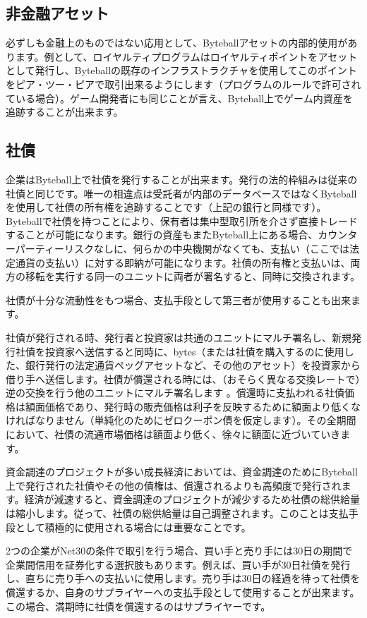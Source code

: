 \documentclass[a4paper, dvipdfmx]{jsarticle}
\begin{document}
\subsection{非金融アセット}
必ずしも金融上のものではない応用として、Byteballアセットの内部的使用があります。例として、ロイヤルティプログラムはロイヤルティポイントをアセットとして発行し、Byteballの既存のインフラストラクチャを使用してこのポイントをピア・ツー・ピアで取引出来るようにします（プログラムのルールで許可されている場合）。ゲーム開発者にも同じことが言え、Byteball上でゲーム内資産を追跡することが出来ます。

\subsection{社債}
企業はByteball上で社債を発行することが出来ます。発行の法的枠組みは従来の社債と同じです。唯一の相違点は受託者が内部のデータベースではなくByteballを使用して社債の所有権を追跡することです（上記の銀行と同様です）。Byteballで社債を持つことにより、保有者は集中型取引所を介さず直接トレードすることが可能になります。銀行の資産もまたByteball上にある場合、カウンターパーティーリスクなしに、何らかの中央機関がなくても、支払い（ここでは法定通貨の支払い）に対する即納が可能になります。社債の所有権と支払いは、両方の移転を実行する同一のユニットに両者が署名すると、同時に交換されます。

社債が十分な流動性をもつ場合、支払手段として第三者が使用することも出来ます。

社債が発行される時、発行者と投資家は共通のユニットにマルチ署名し、新規発行社債を投資家へ送信すると同時に、bytes（または社債を購入するのに使用した、銀行発行の法定通貨ペッグアセットなど、その他のアセット）を投資家から借り手へ送信します。社債が償還される時には、（おそらく異なる交換レートで）逆の交換を行う他のユニットにマルチ署名します 。償還時に支払われる社債価格は額面価格であり、発行時の販売価格は利子を反映するために額面より低くなければなりません（単純化のためにゼロクーポン債を仮定します）。その全期間において、社債の流通市場価格は額面より低く、徐々に額面に近づいていきます。

資金調達のプロジェクトが多い成長経済においては、資金調達のためにByteball上で発行された社債やその他の債権は、償還されるよりも高頻度で発行されます。経済が減速すると、資金調達のプロジェクトが減少するため社債の総供給量は縮小します。従って、社債の総供給量は自己調整されます。このことは支払手段として積極的に使用される場合には重要なことです。

2つの企業がNet30の条件で取引を行う場合、買い手と売り手には30日の期間で企業間信用を証券化する選択肢もあります。例えば、買い手が30日社債を発行し、直ちに売り手への支払いに使用します。売り手は30日の経過を待って社債を償還するか、自身のサプライヤーへの支払手段として使用することが出来ます。この場合、満期時に社債を償還するのはサプライヤーです。
\end{document}
